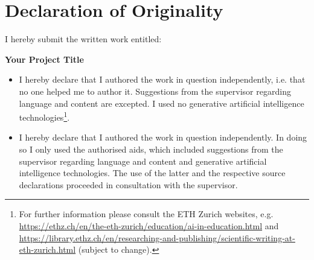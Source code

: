 
\section*{Declaration of Originality}

\vspace{0.5cm}

I hereby submit the written work entitled:

\vspace{0.5cm}

\textbf{Your Project Title}

\vspace{0.25cm}


\begin{itemize}
   \item[$\square$] I hereby declare that I authored the work in question independently, i.e. that no one helped me to author it. Suggestions from the supervisor regarding language and content are excepted. I used no generative artificial intelligence technologies\footnote{For further information please consult the ETH Zurich websites, e.g. \url{https://ethz.ch/en/the-eth-zurich/education/ai-in-education.html} and \url{https://library.ethz.ch/en/researching-and-publishing/scientific-writing-at-eth-zurich.html} (subject to change).}.
   \item[$\blacksquare$] I hereby declare that I authored the work in question independently. In doing so I only used the authorised aids, which included suggestions from the supervisor regarding language and content and generative artificial intelligence technologies. The use of the latter and the respective source declarations proceeded in consultation with the supervisor.
\end{itemize}

\vspace{0.5cm}

